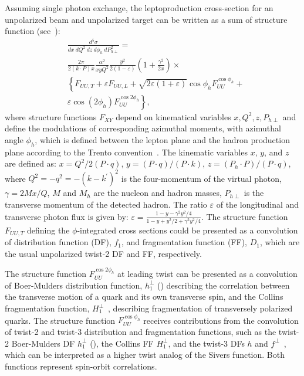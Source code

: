 \documentclass[aps,prl,twocolumn,showpacs,superscriptaddress,groupedaddress]{revtex4}  %
\newcommand{\zh}{z}
\newcommand{\xbj}{x}
\newcommand{\ph}{\phi_h}
\begin{document}
Assuming single photon exchange, the leptoproduction cross-section for an unpolarized beam and unpolarized target can be written as a sum of structure function (see~\cite{Bacchetta:2006tn}):
\begin{equation}
\label{eq:crosssection3}
\begin{split}
& \frac{d^{5} \sigma}{dx\ dQ^2\ dz\ d \phi_{h}\ dP_{h \perp}^{2}} =
\\
& \frac{2\pi}{2(k\cdot P)x} \frac{\alpha^{2}}{xyQ^{2}} \frac{y^{2}}{2 \left( 1 - \varepsilon \right)} \left( 1 + \frac{\gamma^{2}}{2x} \right) \times
\\
& \left\{ F_{UU,T} + \varepsilon F_{UU,L} + \sqrt{2 \varepsilon \left( 1 + \varepsilon \right)} \cos \phi_{h} F^{\cos \phi_{h}}_{UU} + \right.
\\
& \left. \varepsilon \cos \left( 2 \phi_{h} \right) F_{UU}^{\cos2\phi_{h}} \right\},
\end{split}
\end{equation}
where structure functions $F_{XY}$ depend on kinematical variables $x,Q^2,z,P_{h\perp}$ and define the modulations of corresponding azimuthal moments, with azimuthal angle $\phi_{h}$, which is defined between the lepton plane and the hadron production plane according to the Trento convention~\cite{Bacchetta:2004jz}.
The kinematic variables $\xbj$, $y$, and $z$  are defined as: 
$\xbj = Q^2/{2(P\cdot q)}$, $y={(P \cdot q)/(P \cdot k)}$, $\zh=(P_h \cdot P)/(P \cdot q)$, 
where $Q^2=-q^2=-(k-k^\prime)^2$ is the four-momentum 
of the virtual photon,  $\gamma=2M\xbj /Q$,
 $M$ and $M_h$ are the nucleon and hadron masses, $P_{h\perp}$ is the transverse momentum of the 
detected hadron.  The ratio $\varepsilon$ of the longitudinal and transverse photon flux is given by: $\varepsilon=\frac{1-y-\gamma^2y^2/4}{1-y+y^2/2+\gamma^2y^2/4}$.
The structure function  $F_{UU,T}$  defining the $\phi$-integrated cross sections could be presented as a convolution of  distribution function (DF), $f_1$,   and fragmentation function (FF), $D_1$, which  are the usual unpolarized twist-2 DF and FF, respectively. 

The structure function $F^{\cos 2\ph}_{UU}$ at leading twist can be presented as a convolution of Boer-Mulders distribution function, $h_1^\perp$ (\cite{Boer:1997nt}) describing the correlation between the transverse motion
of a quark and its own transverse spin, and  the Collins fragmentation function, $H_1^{\perp}$~\cite{Collins:1992kk}, describing fragmentation of transversely polarized quarks.
The structure function $F^{\cos \ph}_{UU}$  receives contributions 
from the convolution of twist-2 and twist-3 distribution and fragmentation functions,
such as the twist-2 Boer-Mulders DF $h_1^\perp$ (\cite{Boer:1997nt,Pasquini:2010af}), the Collins FF $H_1^{\perp}$, and the twist-3 DFs $h$ and $f^\perp$~\cite{Bacchetta:2006tn}, which can be interpreted as a higher twist analog of the Sivers function. Both functions represent spin-orbit correlations. 
\end{document}
